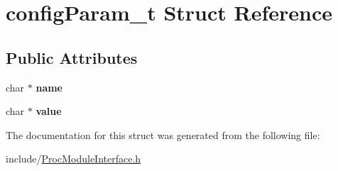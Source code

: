 \hypertarget{structconfigParam__t}{}\section{config\+Param\+\_\+t Struct Reference}
\label{structconfigParam__t}
\subsection*{Public Attributes}
\begin{DoxyCompactItemize}
\item 
\mbox{\label{structconfigParam__t_ab0dc86e40d7b2837ea0d765649ce450a}} 
char $\ast$ {\bfseries name}
\item 
\mbox{\label{structconfigParam__t_a8b2e07217ec9db22113a25c6d43ff19d}} 
char $\ast$ {\bfseries value}
\end{DoxyCompactItemize}


The documentation for this struct was generated from the following file\+:\begin{DoxyCompactItemize}
\item 
include/\hyperlink{ProcModuleInterface_8h}{Proc\+Module\+Interface.\+h}\end{DoxyCompactItemize}

